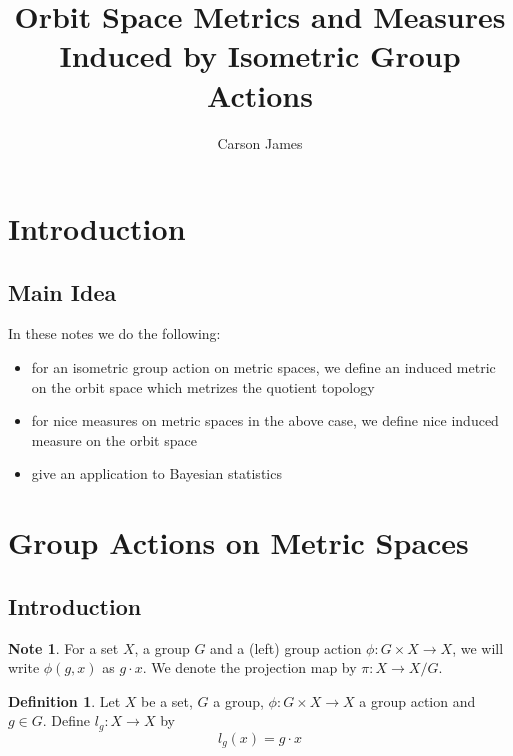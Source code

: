 \documentclass[12pt]{amsart}
\theoremstyle{definition}
\newtheorem{defn}[definition]{Definition}
\newtheorem{note}[definition]{Note}
\newcommand{\ld}[1]{\label{defn:#1}}
\begin{document}
	
	\title{Orbit Space Metrics and Measures Induced by Isometric Group Actions}
	\author{Carson James}
	\maketitle
	
	\tableofcontents
	
	
	\section{Introduction}
	
	\subsection{Main Idea}
	In these notes we do the following: 
	\begin{itemize}
	\item for an isometric group action on metric spaces, we define an induced metric on the orbit space which metrizes the quotient topology
	\item for nice measures on metric spaces in the above case, we define nice induced measure on the orbit space
	\item give an application to Bayesian statistics
	\end{itemize}
	
	
	
	
	
	
	
	
	
	
	
	
	
	
	\newpage
	\section{Group Actions on Metric Spaces}
	
	\subsection{Introduction}
	\begin{note}
	For a set $X$, a group $G$ and a (left) group action $\phi: G \times X \rightarrow X$, we will write $\phi(g, x)$ as $g \cdot x$. We denote the projection map by $\pi: X \rightarrow X/G$.
	\end{note}	
	
	\begin{defn} \ld{00000} 
		Let $X$ be a set, $G$ a group, $\phi: G \times X \rightarrow X$ a group action and $g \in G$. Define $l_g:X \rightarrow X$ by 
		\begin{equation*}
		l_g(x) = g \cdot x
		\end{equation*}
	\end{defn}
	
\end{document}
